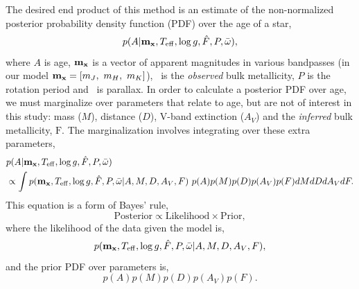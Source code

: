The desired end product of this method is an estimate of the non-normalized
posterior probability density function (PDF) over the age of a star,
\begin{equation} p(A|{\bf m_x}, T_{\mathrm{eff}}, \log g, \hat{F}, P,
    \bar{\omega}), \end{equation} where $A$ is age, ${\bf m_x}$ is a vector of
apparent magnitudes in various bandpasses (in our model ${\bf m_x} =
[m_J,~m_H,~m_K]$), \fhat\ is the {\it observed} bulk metallicity, $P$ is
the rotation period and \pmega\ is parallax.
In order to calculate a posterior PDF over age, we must marginalize over
parameters that relate to age, but are not of interest in this study: mass
($M$), distance ($D$), V-band extinction ($A_V$) and the {\it inferred} bulk
metallicity, $\mathrm{F}$.
The marginalization involves integrating over these extra parameters,
\begin{eqnarray}
& p(A|{\bf m_x}, T_{\mathrm{eff}}, \log g, \hat{F}, P, \bar{\omega})
\\ \nonumber
& \propto \int p({\bf m_x}, T_{\mathrm{eff}}, \log g, \hat{F}, P, \bar{\omega}|
A, M, D, A_V, F)~p(A)p(M)p(D)p(A_V)p(F)
dMdDdA_VdF.
\label{eqn:bayes}
\end{eqnarray}
This equation is a form of Bayes' rule,
\begin{equation}
\mathrm{Posterior} \propto \mathrm{Likelihood} \times \mathrm{Prior},
\end{equation}
where the likelihood of the data given the model is,
\begin{equation}
p({\bf m_x}, T_{\mathrm{eff}}, \log g, \hat{F}, P, \bar{\omega}|A, M, D,
A_V, F),
\end{equation}
and the prior PDF over parameters is,
\begin{equation}
p(A)p(M)p(D)p(A_V)p(F).
\label{eqn:prior}
\end{equation}

